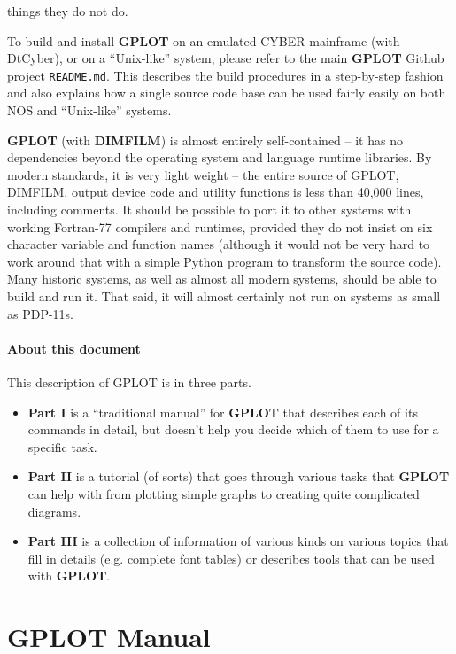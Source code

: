 \documentclass[a4paper,twoside,11pt]{article}
\newcommand{\newpara}{\par\vspace{4mm}\noindent}
\begin{document}
things they do not do.
\newpara
To build and install \textbf{GPLOT} on an emulated CYBER mainframe (with DtCyber), or on a ``Unix-like'' system,
please refer to the main \textbf{GPLOT} Github project \texttt{README.md}. This describes the build procedures in
a step-by-step fashion and also explains how a single source code base can be used fairly easily on both NOS and
``Unix-like'' systems.
\newpara
\textbf{GPLOT} (with \textbf{DIMFILM}) is almost entirely self-contained -- it has no dependencies beyond the operating
system and language runtime libraries. By modern standards, it is very light weight -- the entire source of
GPLOT, DIMFILM, output device code and utility functions is less than 40,000 lines, including comments. It should be possible to
port it to other systems with working Fortran-77 compilers and runtimes, provided they do not insist on six character
variable and function names (although it would not be very hard to work around that with a simple Python program
to transform the source code). Many historic systems, as well as almost all modern systems, should be able to
build and run it. That said, it will almost certainly not run on systems as small as PDP-11s.

\subsection{About this document}
This description of GPLOT is in three parts.

\begin{itemize}
\item \textbf{Part I} is a ``traditional manual'' for \textbf{GPLOT} that describes each of its commands in detail, but doesn't help
  you decide which of them to use for a specific task.
\item \textbf{Part II} is a tutorial (of sorts) that goes through various tasks that \textbf{GPLOT} can help with from plotting
  simple graphs to creating quite complicated diagrams.
\item \textbf{Part III} is a collection of information of various kinds on various topics that fill in details (e.g.
  complete font tables) or describes tools that can be used with \textbf{GPLOT}.
\end{itemize}

\clearpage
\part{\textbf{GPLOT} Manual}
\clearpage
\end{document}
